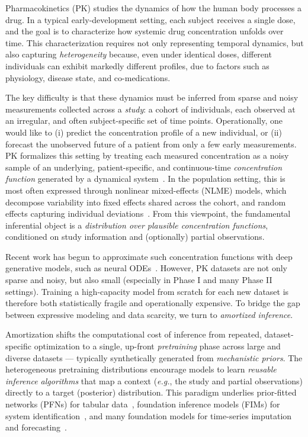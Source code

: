 
Pharmacokinetics (PK) studies the dynamics of how the human body processes a drug.
%
In a typical early-development setting, each subject receives a single dose, and the goal is to characterize how systemic drug concentration unfolds over time.
%
This characterization requires not only representing temporal dynamics, but also capturing \textit{heterogeneity} because, even under identical doses, different individuals can exhibit markedly different profiles, due to factors such as physiology, disease state, and co-medications.

The key difficulty is that these dynamics must be inferred from sparse and noisy measurements collected across a \textit{study}: a cohort of individuals, each observed at an irregular, and often subject-specific set of time points. 
%
Operationally, one would like to (i) predict the concentration profile of a new individual, or (ii) forecast the unobserved future of a patient from only a few early measurements.
%
PK formalizes this setting by treating each measured concentration as a noisy sample of an underlying, patient-specific, and continuous-time \textit{concentration function} generated by a dynamical system~\citep{gibaldi1982pharmacokinetics}.
%
In the population setting, this is most often expressed through nonlinear mixed-effects (NLME) models, which decompose variability into fixed effects shared across the cohort, and random effects capturing individual deviations~\citep{lavielle2014}.
%
From this viewpoint, the fundamental inferential object is a \textit{distribution over plausible concentration functions}, conditioned on study information and (optionally) partial observations.

Recent work has begun to approximate such concentration functions with deep generative models, such as neural ODEs~\citep{lu2021deep}. 
%
However, PK datasets are not only sparse and noisy, but also small (especially in Phase I and many Phase II settings). 
%
Training a high-capacity model from scratch for each new dataset is therefore both statistically fragile and operationally expensive. 
%
To bridge the gap between expressive modeling and data scarcity, we turn to \textit{amortized inference}.

Amortization shifts the computational cost of inference from repeated, dataset-specific optimization to a single, up-front \textit{pretraining} phase across large and diverse datasets --- typically synthetically generated from \textit{mechanistic priors}. 
%
The heterogeneous pretraining distributions encourage models to learn \textit{reusable inference algorithms} that map a context (\textit{e.g.}, the study and partial observations) directly to a target (posterior) distribution.
%
This paradigm underlies prior-fitted networks (PFNs) for tabular data~\citep{muller2022transformers, hollmann2023tabpfn, hollmann2025accurate}, foundation inference models (FIMs) for system identification~\citep{berghaus2024foundation, fim_sde, berghaus2026incontext, hubers2026foundation}, and many foundation models for time-series imputation~\citep{seifner2025zeroshot} and forecasting~\citep{dooley2024forecastpfn, bhethanabhotla2024mamba4cast, hemmer2025true}.

